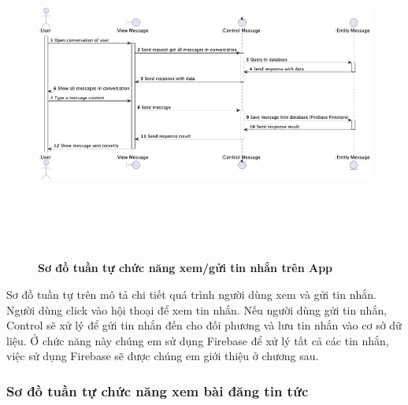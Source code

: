   \begin{figure}[H]
        \centering
        \includegraphics[width=16cm,height=11cm]{Images/mobile_app/send_and_receive_message.png}
        \caption[Sơ đồ tuần tự chức năng xem/gửi tin nhắn trên App]{\bfseries \fontsize{12pt}{0pt}
        \selectfont Sơ đồ tuần tự chức năng xem/gửi tin nhắn trên App}
        \label{send_and_receive_message} %
  \end{figure}

  Sơ đồ tuần tự trên mô tả chi tiết quá trình người dùng xem và gửi tin nhắn. Người dùng click vào hội thoại để xem tin nhắn. 
  Nếu người dùng gửi tin nhắn, Control sẽ xử lý để gửi tin nhắn đến cho đối phương và lưu tin nhắn vào cơ sở dữ liệu. Ở chức năng
  này chúng em sử dụng Firebase để xử lý tất cả các tin nhắn, việc sử dụng Firebase sẽ được chúng em giới thiệu ở chương sau.

\subsubsection{Sơ đồ tuần tự chức năng xem bài đăng tin tức}

